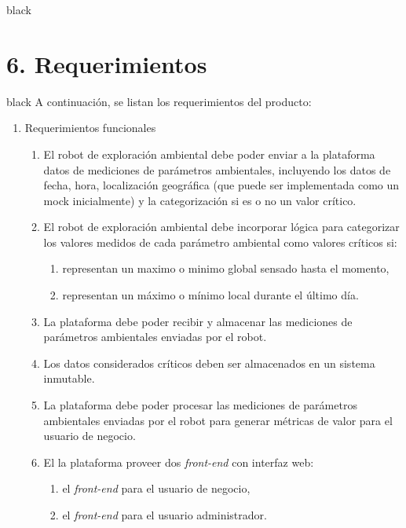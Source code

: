 \documentclass[
11pt, %
]{charter}
\begin{document}
\begin{consigna}{black}
\end{consigna}

\section{6. Requerimientos}
\label{sec:requerimientos}
\begin{consigna}{black}
A continuación, se listan los requerimientos del producto:

\begin{enumerate}	
	\item Requerimientos funcionales		
	\begin{enumerate}	
		
		\item El robot de exploración ambiental debe poder enviar a la plataforma datos de mediciones de parámetros ambientales, incluyendo los datos de fecha, hora, localización geográfica (que puede ser implementada como un mock inicialmente) y la categorización si es o no un valor crítico.
		\item El robot de exploración ambiental debe incorporar lógica para categorizar los valores medidos de cada parámetro ambiental como valores críticos si:
		\begin{enumerate}				
			\item representan un maximo o minimo global sensado hasta el momento,				
			\item representan un máximo o mínimo local durante el último día.				
		\end{enumerate}			
		\item La plataforma debe poder recibir y almacenar las mediciones de parámetros ambientales enviadas por el robot.
		\item Los datos considerados críticos deben ser almacenados en un sistema inmutable.
		\item La plataforma debe poder procesar las mediciones de parámetros ambientales enviadas por el robot para generar métricas de valor para el usuario de negocio.		
		\item El la plataforma proveer dos \textit{front-end} con interfaz web:
			\begin{enumerate}				
				\item el \textit{front-end} para el usuario de negocio,				
				\item el \textit{front-end} para el usuario administrador.				
			\end{enumerate}			
		

\end{enumerate}
\end{enumerate}
\end{consigna}
\end{document}
